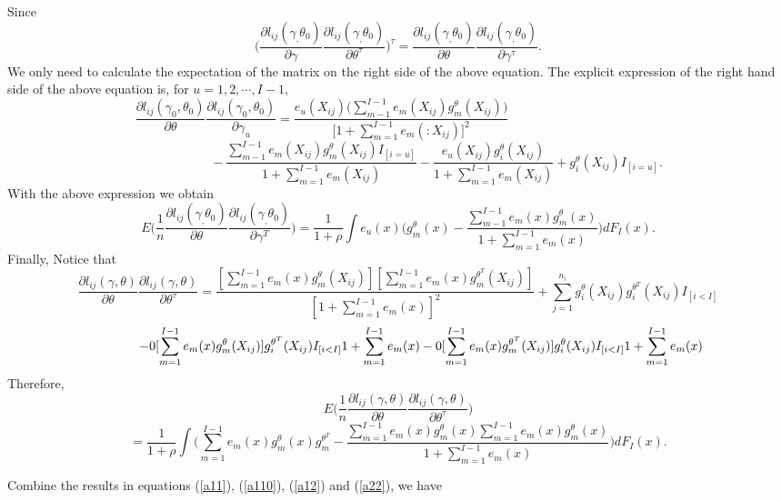 \documentclass[11pt]{article}
\theoremstyle{plain}
\theoremstyle{definition}
\theoremstyle{remark}
\theoremstyle{definition}
\begin{document}
Since
$$\Big(\frac{\partial l_{ij}(\gamma_,\theta_0)}{\partial
\gamma}\frac{\partial l_{ij}(\gamma_,\theta_0)}{\partial
\theta^\tau}\Big)^\tau =\frac{\partial
l_{ij}(\gamma_,\theta_0)}{\partial \theta}\frac{\partial
l_{ij}(\gamma_,\theta_0)}{\partial \gamma^\tau}.$$
We only need to calculate the expectation of the matrix on the
right side of the above equation. The explicit expression of the
right hand side of the above equation is, for $u=1, 2, \cdots,
I-1,$
$$\frac{\partial
l_{ij}(\gamma_0,\theta_0)}{\partial \theta}\frac{\partial
l_{ij}(\gamma_0,\theta_0)}{\partial
\gamma_u}=\frac{e_u(X_{ij})\big(\sum_{m-1}^{I-1}
e_m(X_{ij})g_m^\theta (X_{ij})\big)}{\big[1+\sum_{m=1}^{I-1}e_m(:X_{ij})
\big]^2}\hspace{2in}$$
$$\hspace{1in}-\frac{\sum_{m-1}^{I-1}e_m(X_{ij})g_m^\theta(X_{ij})I_{[i=u]}}{1+\sum_{m=1}^{I-1}e_m(X_{ij})}
-\frac{e_u(X_{ij})g_i^\theta(X_{ij})}{1+\sum_{m=1}^{I-1}e_m(X_{ij})}+
g_i^\theta(X_{ij}) I_{[i=u]}.$$
With the above expression we obtain
\begin{equation}
E\Big(\frac{1}{n}\frac{\partial l_{ij}(\gamma_,\theta_0)}{\partial
\theta}\frac{\partial l_{ij}(\gamma_,\theta_0)}{\partial
\gamma^T}\Big)=\frac{1}{1+\rho}\int e_u(x)\Big(g_m^\theta(x)-\frac{\sum_{m-1}^{I-1}e_m(x)
g_m^\theta(x)}{1+\sum_{m=1}^{I-1}e_m(x)}\Big)dF_I(x).
\label{a12}
\end{equation}
Finally, Notice that
$$
\frac{\partial l_{ij}(\gamma,\theta)}{\partial\theta}
\frac{\partial l_{ij}(\gamma,\theta)}{\partial\theta^\tau}
=\frac{[\sum_{m=1}^{I-1}e_m(x) g_m^\theta(X_{ij})]
[\sum_{m=1}^{I-1}e_m(x) g_m^{\theta^T}(X_{ij})]}{[1+\sum_{m=1}^{I-1}e_m(x)]^2}+\sum_{j=1}^{n_i} g_i^\theta(X_{ij})g_i^{\theta^T}(X_{ij})I_{[i<I]}$$
$$\hspace{0.5in}-\frac{[\sum_{m=1}^{I-1}e_m(x)g_m^\theta(X_{ij})]g_i^{\theta^T}(X_{ij})I_{[i<I]}}{1+\sum_{m=1}^{I-1}e_m(x)}
-\frac{[\sum_{m=1}^{I-1}e_m(x)g_m^{\theta^T}(X_{ij})]g_i^{\theta}(X_{ij})I_{[i<I]}}{1+\sum_{m=1}^{I-1}e_m(x)}$$
Therefore,
$$
E\Big(\frac{1}{n}\frac{\partial l_{ij}(\gamma,\theta)}{\partial\theta}
\frac{\partial l_{ij}(\gamma,\theta)}{\partial\theta^\tau}\Big)
$$
\begin{equation}
=\frac{1}{1+\rho}\int
\Big(\sum_{m=1}^{I-1}e_m(x) g_m^\theta(x)g_m^{\theta^T}
-\frac{\sum_{m=1}^{I-1}e_m(x)g_m^\theta(x)\sum_{m=1}^{I-1}e_m(x)g_m^\theta(x)}{1+\sum_{m=1}^{I-1}e_m(x)}\Big)dF_I(x).
\label{a22}
\end{equation}

Combine the results in equations (\ref{a11}), (\ref{a110}),
(\ref{a12}) and (\ref{a22}), we have
\end{document}
